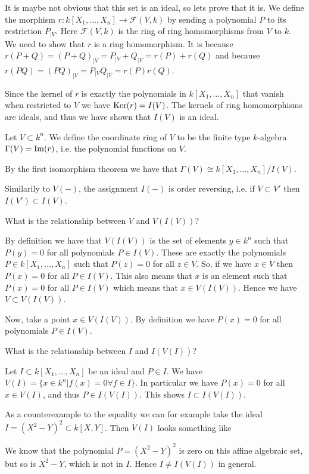 It is maybe not obvious that this set is an ideal, so lets prove that it is. We define the morphism $r:k[X_1, \ldots, X_n] \longrightarrow \mathcal{F}(V, k)$ by sending a polynomial $P$ to its restriction $P_{\vert V}$. Here $\mathcal{F}(V, k)$ is the ring of ring homomorphisms from $V$ to $k$. We need to show that $r$ is a ring homomorphism. It is because $r(P+Q) = (P+Q)_{\vert V} = P_{\vert V} + Q_{\vert V} = r(P)+r(Q)$ and because $r(PQ) = (PQ)_{\vert V} = P_{\vert V}Q_{\vert V} = r(P)r(Q)$. 

Since the kernel of $r$ is exactly the polynomials in $k[X_1, \ldots, X_n]$ that vanish when restricted to $V$ we have $\operatorname{Ker}(r) = I(V)$. The kernels of ring homomorphisms are ideals, and thus we have shown that $I(V)$ is an ideal. 

\begin{definition}
Let $V\subset k^n$. We define the coordinate ring of $V$ to be the finite type $k$-algebra $\Gamma(V)= \operatorname{Im}(r)$, i.e. the polynomial functions on $V$. 
\end{definition}

By the first isomorphism theorem we have that $\Gamma(V) \cong k[X_1, \ldots, X_n]/I(V)$. 

Similarily to $V(-)$, the assignment $I(-)$ is order reversing, i.e. if $V\subset V'$ then $I(V')\subset I(V)$. 

\begin{problem}
What is the relationship between $V$ and $V(I(V))$?
\end{problem}
\begin{solution}
By definition we have that $V(I(V))$ is the set of elements $y\in k^n$ such that $P(y) = 0$ for all polynomials $P\in I(V)$. These are exactly the polynomials $P\in k[X_1, \ldots, X_n]$ such that $P(z)=0$ for all $z\in V$. So, if we have $x\in V$ then $P(x)=0$ for all $P\in I(V)$. This also means that $x$ is an element such that $P(x)=0$ for all $P\in I(V)$ which means that $x\in V(I(V))$. Hence we have $V\subset V(I(V))$.  

Now, take a point $x\in V(I(V))$. By definition we have $P(x)=0$ for all polynomials $P\in I(V)$. 
\end{solution}

\begin{problem}
What is the relationship between $I$ and $I(V(I))$?
\end{problem}
\begin{solution}
Let $I\subset k[X_1, \ldots, X_n]$ be an ideal and $P\in I$. We have $V(I) = \{ x\in k^n \vert f(x)=0 \forall f\in I\}$. In particular we have $P(x)=0$ for all $x\in V(I)$, and thus $P\in I(V(I))$. This shows $I\subset I(V(I))$.

As a counterexample to the equality we can for example take the ideal $I=(X^2-Y)^2\subset k[X, Y]$. Then $V(I)$ looks something like 
\begin{center}
\def\svgwidth{0.4\textwidth}

\end{center}
We know that the polynomial $P=(X^2-Y)^2$ is zero on this affine algebraic set, but so is $X^2-Y$, which is not in $I$. Hence $I\neq I(V(I))$ in general. 
\end{solution}

